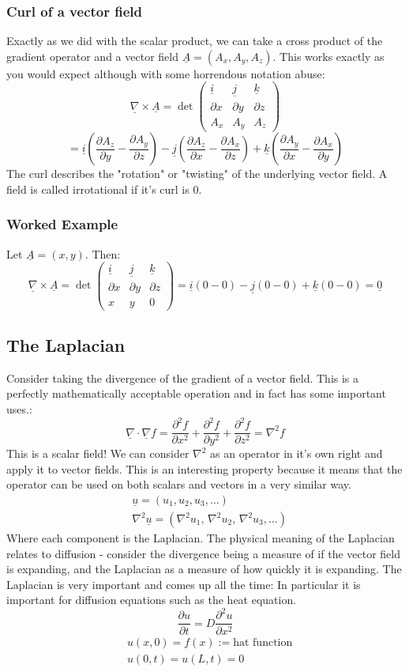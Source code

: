 \documentclass[12pt]{article}
\newcommand{\pf}[2]{\frac{\partial #1}{\partial #2}}
\newcommand{\dive}[1]{\underline{\nabla}\cdot\underline{#1}}
\newcommand{\curl}[1]{\underline{\nabla}\times \underline{#1}}
\begin{document}
\subsubsection{Curl of a vector field}
Exactly as we did with the scalar product, we can take a cross product of the gradient operator and a vector field \(\underline{A}=(A_x,A_y,A_z)\). This works exactly as you would expect although with some horrendous notation abuse:
\[\curl{A}=\det\begin{pmatrix}
    \underline{i} & \underline{j} & \underline{k} \\
    \partial x & \partial y & \partial z \\
    A_x & A_y & A_z
\end{pmatrix}\]
\[=\underline{i}\left(\pf{A_z}{y}-\pf{A_y}{z}\right)-\underline{j}\left(\pf{A_z}{x}-\pf{A_x}{z}\right)+\underline{k}\left(\pf{A_y}{x}-\pf{A_x}{y}\right)\]
The curl describes the "rotation" or "twisting" of the underlying vector field. A field is called irrotational if it's curl is \(0\).
\subsubsection*{Worked Example}
Let \(\underline{A}=(x,y)\). Then:
\[\curl{A}=\det\begin{pmatrix}
    \underline{i} & \underline{j} & \underline{k} \\
    \partial x& \partial y & \partial z \\
    x & y & 0
\end{pmatrix}= \underline{i}(0-0)-\underline{j}(0-0)+\underline{k}(0-0)=\underline{0}\]
\subsection{The Laplacian}
Consider taking the divergence of the gradient of a vector field. This is a perfectly mathematically acceptable operation and in fact has some important uses.:
\[\dive{\nabla}f=\pf{^2f}{x^2}+\pf{^2f}{y^2}+\pf{^2f}{z^2}=\nabla^2f\]
This is a scalar field! We can consider \(\nabla^2\) as an operator in it's own right and apply it to vector fields. This is an interesting property because it means that the operator can be used on both scalars and vectors in a very similar way.
\begin{align*}
    &\underline{u}=(u_1,u_2,u_3,\dots) \\
    &\nabla^2\underline{u}=(\nabla^2u_1,\,\nabla^2u_2,\,\nabla^2u_3,\dots)
\end{align*}
Where each component is the Laplacian. The physical meaning of the Laplacian relates to diffusion - consider the divergence being a measure of if the vector field is expanding, and the Laplacian as a measure of how quickly it is expanding. The Laplacian is very important and comes up all the time: In particular it is important for diffusion equations such as the heat equation.
\[\pf{u}{t}=D\pf{^2u}{x^2}\]
\begin{align*}
    &u(x,0)=f(x):=\text{hat function} \\
    &u(0,t)=u(L,t)=0
\end{align*}
\end{document}
